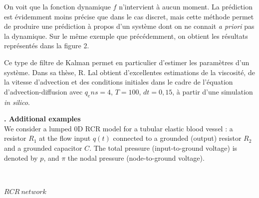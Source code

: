 \documentclass[a4paper]{article}
\newcounter{c}
\newcounter{d}
\newcounter{r}
\newcounter{e}
\newcommand{\chapitre}[1]{\stepcounter{c}\setcounter{e}{0}\setcounter{d}{0}\setcounter{r}{0}\noindent\textbf{\Large\arabic{c}. #1}\\}
\begin{document}
On voit que la fonction dynamique $f$ n'intervient à aucun moment. La prédiction est évidemment moins précise que dans le cas discret, mais cette méthode permet de produire une prédiction à propos d'un système dont on ne connait \emph{a priori} pas la dynamique. Sur le même exemple que précédemment, on obtient les résultats représentés dans la figure 2.


Ce type de filtre de Kalman permet en particulier d'estimer les paramètres d'un système. Dans sa thèse, R. Lal obtient d'excellentes estimations de la viscosité, de la vitesse d'advection et des conditions initiales dans le cadre de l'équation d'advection-diffusion avec $q_ens = 4$, $T=100$, $dt=0,15$, à partir d'une simulation \emph{in silico}.


\newpage
\chapitre{Additional examples}

We consider a lumped 0D RCR model for a tubular elastic blood vessel : a resistor $R_1$ at the flow input $q(t)$ connected to a grounded (output) resistor $R_2$ and a grounded capacitor $C$. The total pressure (input-to-ground voltage) is denoted by $p$, and $\pi$ the nodal pressure (node-to-ground voltage).


\begin{center}


~


$RCR~network$
\end{center}
\end{document}
